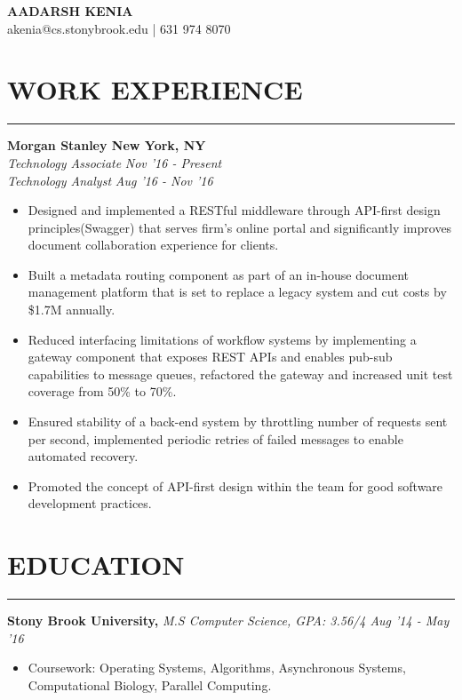 \documentclass[12pt]{article}
\newcommand{\sectionHeading}[1]{
\section*{\small{#1}}
\vspace{-8pt}
\hrule
\vspace{8pt}
}
\newcommand{\experienceSectionSubheadingAlternate}[6]{
  \vspace{-1pt}
    \small{\textbf{Morgan Stanley \hfill New York, NY}} \\
    \small{\textit{#3} \hfill \textit{#4}} \\
    \small{\textit{#5} \hfill \textit{#6}} \\
    \vspace{-15pt}
}
\newcommand{\sectionHeading}[1]{
\section*{\small{#1}}
\vspace{-8pt}
\hrule
\vspace{8pt}
}
\newcommand{\experienceSectionSubheadingAlternate}[6]{
  \vspace{-1pt}
    \small{\textbf{Morgan Stanley \hfill New York, NY}} \\
    \small{\textit{#3} \hfill \textit{#4}} \\
    \small{\textit{#5} \hfill \textit{#6}} \\
    \vspace{-15pt}
}
\newcommand{\educationSectionSubheading}[3]{
    \noindent \small{\textbf{#1, }\textit{#2 \hfill #3}} \vspace{-20pt}\\
}
\newcommand{\sectionListStart}{\begin{itemize}[label={\small{\textbullet}},noitemsep]}
\newcommand{\sectionListEnd}{\end{itemize}}
\newcommand{\sectionListItem}[1]{\item \small{#1}}
\begin{document}
\begin{center}
\LARGE{\textbf{AADARSH KENIA}}\\
\vspace{4pt}
\small{\Letter \hspace{1mm}akenia@cs.stonybrook.edu} | \Telefon \hspace{1mm}631 974 8070
\end{center}

\sectionHeading{WORK EXPERIENCE}
\experienceSectionSubheadingAlternate
{Morgan Stanley}{New York, NY}
{Technology Associate}{Nov '16 - Present}
{Technology Analyst}{Aug '16 - Nov '16}
\sectionListStart
    \sectionListItem
        Designed and implemented a RESTful middleware through API-first design principles(Swagger) that serves firm's online portal and significantly improves document collaboration experience for clients.
    \sectionListItem
        Built a metadata routing component as part of an in-house document management platform that is set to replace a legacy system and cut costs by \$1.7M annually.
    \sectionListItem
        Reduced interfacing limitations of workflow systems by implementing a gateway component that exposes REST APIs  and enables pub-sub capabilities to message queues, refactored the gateway and increased unit test coverage from 50\% to 70\%. 
    \sectionListItem
        Ensured stability of a back-end system by throttling number of requests sent per second, implemented periodic retries of failed messages to enable automated recovery.
    \sectionListItem
        Promoted the concept of API-first design within the team for good software development practices.
\sectionListEnd


\sectionHeading{EDUCATION}
\educationSectionSubheading
{Stony Brook  University}{M.S Computer Science, GPA: 3.56/4}{Aug '14 - May '16}
\sectionListStart
    \sectionListItem
        Coursework: Operating Systems, Algorithms, Asynchronous Systems, Computational Biology, Parallel Computing. 
\sectionListEnd
\end{document}
